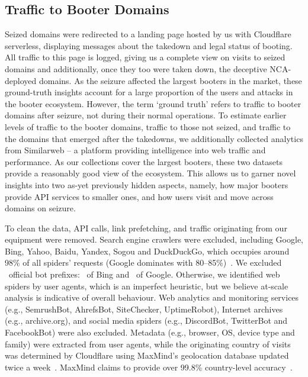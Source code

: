 \documentclass[letterpaper,twocolumn,10pt]{article}
\begin{document}
\subsection{Traffic to Booter Domains}
Seized domains were redirected to a landing page hosted by us with Cloudflare serverless, displaying messages about the takedown and legal status of booting. All traffic to this page is logged, giving us a complete view on visits to seized domains and additionally, once they too were taken down, the deceptive NCA-deployed domains. As the seizure affected the largest booters in the market, these ground-truth insights account for a large proportion of the users and attacks in the booter ecosystem. However, the term `ground truth' refers to traffic to booter domains after seizure, not during their normal operations. To estimate earlier levels of traffic to the booter domains, traffic to those not seized, and traffic to the domains that emerged after the takedowns, we additionally collected analytics from Similarweb -- a platform providing intelligence into web traffic and performance. As our collections cover the largest booters, these two datasets provide a reasonably good view of the ecosystem. This allows us to garner novel insights into two as-yet previously hidden aspects, namely, how major booters provide API services to smaller ones, and how users visit and move across domains on seizure.

 To clean the data, API calls, link prefetching, and traffic originating from our equipment were removed. Search engine crawlers were excluded, including Google, Bing, Yahoo, Baidu, Yandex, Sogou and DuckDuckGo, which occupies around 98\% of all spiders' requests (Google dominates with 80--85\%)~\cite{searchenginemarketshare}. We excluded \MSnTotalBotPrefixes~official bot prefixes: \MSnBingBotPrefixes~of Bing and \MSnGoogleBotPrefixes~of Google. Otherwise, we identified web spiders by user agents, which is an imperfect heuristic, but we believe at-scale analysis is indicative of overall behaviour. Web analytics and monitoring services (e.g., SemrushBot, AhrefsBot, SiteChecker, UptimeRobot), Internet archives (e.g., archive.org), and social media spiders (e.g., DiscordBot, TwitterBot and FacebookBot) were also excluded. Metadata (e.g., browser, OS, device type and family) were extracted from user agents, while the originating country of visits was determined by Cloudflare using MaxMind's geolocation database updated twice a week~\cite{cloudflareipgeo}. MaxMind claims to provide over 99.8\% country-level accuracy~\cite{maxmindaccuracy}.
\end{document}
